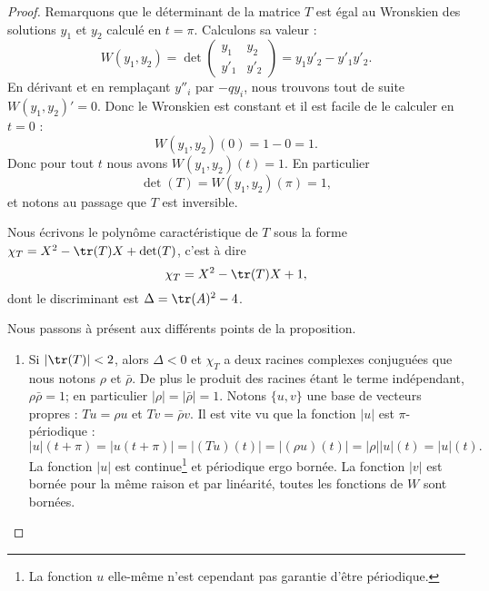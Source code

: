 \begin{proof}
    Remarquons que le déterminant de la matrice \( T\) est égal au Wronskien des solutions \( y_1\) et \( y_2\) calculé en \( t=\pi\). Calculons sa valeur :
    \begin{equation}
        W(y_1,y_2)=\det\begin{pmatrix}
            y_1    &   y_2    \\ 
            y'_1    &   y'_2    
        \end{pmatrix}=y_1y'_2-y'_1y'_2.
    \end{equation}
    En dérivant et en remplaçant \( y''_i\) par \( -qy_i\), nous trouvons tout de suite \( W(y_1,y_2)'=0\). Donc le Wronskien est constant et il est facile de le calculer en \( t=0\) :
    \begin{equation}
        W(y_1,y_2)(0)=1-0=1.
    \end{equation}
    Donc pour tout \( t\) nous avons \( W(y_1,y_2)(t)=1\). En particulier
    \begin{equation}
        \det(T)=W(y_1,y_2)(\pi)=1,
    \end{equation}
    et notons au passage que \( T\) est inversible.

    Nous écrivons le polynôme caractéristique de \( T\) sous la forme \( \chi_T=X^2-\tr(T)X+\det(T)\), c'est à dire
    \begin{equation}
        \chi_T=X^2-\tr(T)X+1,
    \end{equation}
    dont le discriminant est \( \Delta=\tr(A)^2-4\).

    Nous passons à présent aux différents points de la proposition.
    \begin{enumerate}
        \item
            Si \( | \tr(T) |<2\), alors \( \Delta<0\) et \( \chi_T\) a deux racines complexes conjuguées que nous notons \( \rho\) et \( \bar\rho\). De plus le produit des racines étant le terme indépendant, \( \rho\bar\rho=1\); en particulier \( | \rho |=| \bar \rho |=1\). Notons \( \{ u,v \}\) une base de vecteurs propres : \( Tu=\rho u\) et \( Tv=\bar \rho v\). Il est vite vu que la fonction \( | u |\) est \( \pi\)-périodique :
            \begin{equation}
                | u |(t+\pi)=| u(t+\pi) |=| (Tu)(t) |=| (\rho u)(t) |=| \rho | | u |(t)=| u |(t).
            \end{equation}
            La fonction \( | u |\) est continue\footnote{La fonction \( u\) elle-même n'est cependant pas garantie d'être périodique.} et périodique ergo bornée. La fonction \( | v |\) est bornée pour la même raison et par linéarité, toutes les fonctions de \( W\) sont bornées.


\end{enumerate}
\end{proof}
